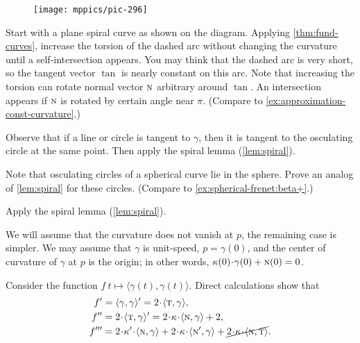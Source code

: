 \begin{multicols}{2}
\begin{wrapfigure}{r}{19 mm}
\vskip-5mm
\centering
\texttt{[image: mppics/pic-296]}
\vskip-0mm
\end{wrapfigure}

Start with a plane spiral curve as shown on the diagram.
Applying \ref{thm:fund-curves}, increase the torsion of the dashed arc without changing the curvature until a self-intersection appears.
You may think that the dashed arc is very short, so the tangent vector $\tan$ is nearly constant on this arc. 
Note that increasing the torsion can rotate normal vector $\text{\sc{n}}$ arbitrary around $\tan$.
An intersection appears if $\text{\sc{n}}$ is rotated by certain angle near $\pi$.
(Compare to \ref{ex:approximation-const-curvature}.)

Observe that if a line or circle is tangent to $\gamma$,
then it is tangent to the osculating circle at the same point.
Then apply the spiral lemma (\ref{lem:spiral}).

Note that osculating circles of a spherical curve lie in the sphere.
Prove an analog of \ref{lem:spiral} for these circles.
(Compare to \ref{ex:spherical-frenet:beta+}.)



\setcounter{eqtn}{0}

Apply the spiral lemma (\ref{lem:spiral}).

We will assume that the curvature does not vanish at $p$, the remaining case is simpler.
We may assume that $\gamma$ is unit-speed, $p=\gamma(0)$,
and the center of curvature of $\gamma$ at $p$ is the origin;
in other words, $\kur(0)\cdot\gamma(0)+ \norm(0)=0$.

Consider the function $f\:t\mapsto \langle\gamma(t),\gamma(t)\rangle$.
Direct calculations show that 
\begin{align*}
f'
&=\langle\gamma,\gamma\rangle'
=2\cdot\langle\tan,\gamma\rangle,
\\
f''
&=2\cdot\langle\tan,\gamma\rangle'
=2\cdot\kur\cdot\langle\norm,\gamma\rangle+2,
\\
f'''
&=2\cdot\kur'\cdot\langle\norm,\gamma\rangle
+2\cdot\kur\cdot\langle\norm',\gamma\rangle+\cancel{2\cdot\kur\cdot\langle\norm,\tan\rangle}.
\end{align*}


\end{multicols}
